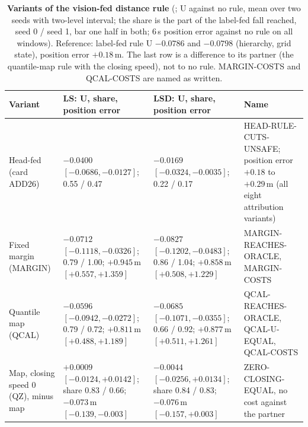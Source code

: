 \begin{table}[!tp]
\centering
\caption{\textbf{Variants of the vision-fed distance rule} (; U against no rule, mean over two seeds with two-level interval; the share is the part of the label-fed fall reached, seed 0 / seed 1, bar one half in both; 6\,s position error against no rule on all windows). Reference: label-fed rule U $-0.0786$ and $-0.0798$ (hierarchy, grid state), position error $+0.18$\,m. The last row is a difference to its partner (the quantile-map rule with the closing speed), not to no rule. MARGIN-COSTS and QCAL-COSTS are named as written.}
\label{tab:vrule}
\scriptsize
\begin{tabularx}{\textwidth}{@{}>{\raggedright\arraybackslash}p{34mm}>{\raggedright\arraybackslash}X>{\raggedright\arraybackslash}X>{\raggedright\arraybackslash}X@{}}
\toprule
Variant & LS: U, share, position error & LSD: U, share, position error & Name \\
\midrule
Head-fed (card ADD26) & $-0.0400$ $[-0.0686,-0.0127]$; 0.55 / 0.47 & $-0.0169$ $[-0.0324,-0.0035]$; 0.22 / 0.17 & HEAD-RULE-CUTS-UNSAFE; position error $+0.18$ to $+0.29$\,m (all eight attribution variants) \\
Fixed margin (MARGIN) & $-0.0712$ $[-0.1118,-0.0326]$; 0.79 / 1.00; $+0.945$\,m $[+0.557,+1.359]$ & $-0.0827$ $[-0.1202,-0.0483]$; 0.86 / 1.04; $+0.858$\,m $[+0.508,+1.229]$ & MARGIN-REACHES-ORACLE, MARGIN-COSTS \\
Quantile map (QCAL) & $-0.0596$ $[-0.0942,-0.0272]$; 0.79 / 0.72; $+0.811$\,m $[+0.488,+1.189]$ & $-0.0685$ $[-0.1071,-0.0355]$; 0.66 / 0.92; $+0.877$\,m $[+0.511,+1.261]$ & QCAL-REACHES-ORACLE, QCAL-U-EQUAL, QCAL-COSTS \\
Map, closing speed 0 (QZ), minus map & $+0.0009$ $[-0.0124,+0.0142]$; share 0.83 / 0.66; $-0.073$\,m $[-0.139,-0.003]$ & $-0.0044$ $[-0.0256,+0.0134]$; share 0.84 / 0.83; $-0.076$\,m $[-0.157,+0.003]$ & ZERO-CLOSING-EQUAL, no cost against the partner \\
\bottomrule
\end{tabularx}
\end{table}

